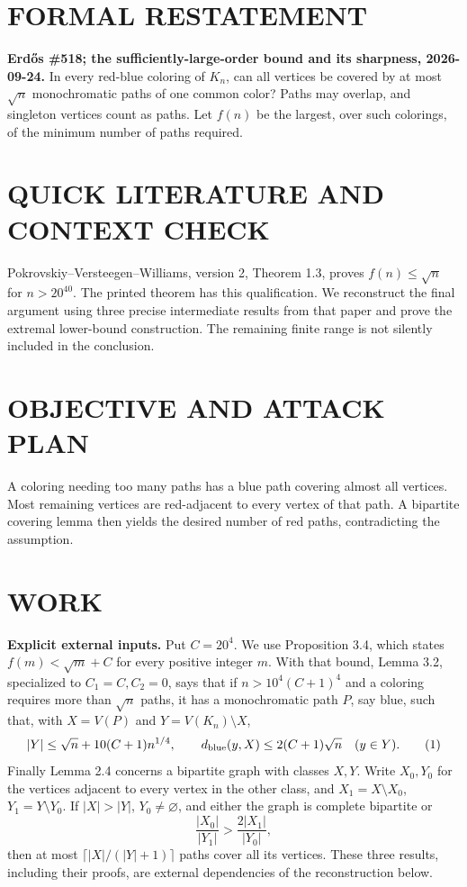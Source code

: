 \section{FORMAL RESTATEMENT}
\textbf{Erd\H{o}s \#518; the sufficiently-large-order bound and its sharpness, 2026-09-24.}
In every red-blue coloring of $K_n$, can all vertices be covered by at most $\sqrt n$ monochromatic paths of one common color? Paths may overlap, and singleton vertices count as paths. Let $f(n)$ be the largest, over such colorings, of the minimum number of paths required.

\section{QUICK LITERATURE AND CONTEXT CHECK}
Pokrovskiy--Versteegen--Williams, version 2, Theorem 1.3, proves $f(n)\leq\sqrt n$ for $n>20^{40}$. The printed theorem has this qualification. We reconstruct the final argument using three precise intermediate results from that paper and prove the extremal lower-bound construction. The remaining finite range is not silently included in the conclusion.

\section{OBJECTIVE AND ATTACK PLAN}
A coloring needing too many paths has a blue path covering almost all vertices. Most remaining vertices are red-adjacent to every vertex of that path. A bipartite covering lemma then yields the desired number of red paths, contradicting the assumption.

\section{WORK}
\textbf{Explicit external inputs.} Put $C=20^4$. We use Proposition 3.4, which states $f(m)<\sqrt m+C$ for every positive integer $m$. With that bound, Lemma 3.2, specialized to $C_1=C,C_2=0$, says that if $n>10^4(C+1)^4$ and a coloring requires more than $\sqrt n$ paths, it has a monochromatic path $P$, say blue, such that, with $X=V(P)$ and $Y=V(K_n)\setminus X$,
\[
 |Y|\leq\sqrt n+10(C+1)n^{1/4},\qquad
 d_{\rm blue}(y,X)\leq2(C+1)\sqrt n\quad(y\in Y).       \tag{1}
\]
Finally Lemma 2.4 concerns a bipartite graph with classes $X,Y$. Write $X_0,Y_0$ for the vertices adjacent to every vertex in the other class, and $X_1=X\setminus X_0$, $Y_1=Y\setminus Y_0$. If $|X|>|Y|$, $Y_0\ne\varnothing$, and either the graph is complete bipartite or
\[
 \frac{|X_0|}{|Y_1|}>\frac{2|X_1|}{|Y_0|},             \tag{2}
\]
then at most $\lceil |X|/(|Y|+1)\rceil$ paths cover all its vertices. These three results, including their proofs, are external dependencies of the reconstruction below.


